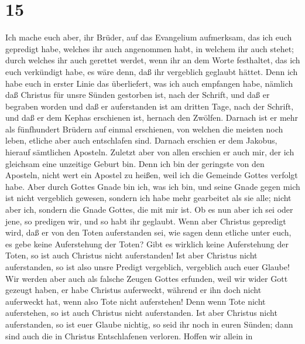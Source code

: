 \hypertarget{section-14}{%
\section{15}\label{section-14}}

 Ich mache euch aber, ihr Brüder, auf das Evangelium
aufmerksam, das ich euch gepredigt habe, welches ihr auch angenommen
habt, in welchem ihr auch stehet;  durch welches ihr auch
gerettet werdet, wenn ihr an dem Worte festhaltet, das ich euch
verkündigt habe, es wäre denn, daß ihr vergeblich geglaubt hättet.
 Denn ich habe euch in erster Linie das überliefert, was
ich auch empfangen habe, nämlich daß Christus für unsre Sünden gestorben
ist, nach der Schrift,  und daß er begraben worden und daß
er auferstanden ist am dritten Tage, nach der Schrift, 
und daß er dem Kephas erschienen ist, hernach den Zwölfen.
 Darnach ist er mehr als fünfhundert Brüdern auf einmal
erschienen, von welchen die meisten noch leben, etliche aber auch
entschlafen sind.  Darnach erschien er dem Jakobus,
hierauf sämtlichen Aposteln.  Zuletzt aber von allen
erschien er auch mir, der ich gleichsam eine unzeitige Geburt bin.
 Denn ich bin der geringste von den Aposteln, nicht wert
ein Apostel zu heißen, weil ich die Gemeinde Gottes verfolgt habe.
 Aber durch Gottes Gnade bin ich, was ich bin, und seine
Gnade gegen mich ist nicht vergeblich gewesen, sondern ich habe mehr
gearbeitet als sie alle; nicht aber ich, sondern die Gnade Gottes, die
mit mir ist.  Ob es nun aber ich sei oder jene, so
predigen wir, und so habt ihr geglaubt.  Wenn aber
Christus gepredigt wird, daß er von den Toten auferstanden sei, wie
sagen denn etliche unter euch, es gebe keine Auferstehung der Toten?
 Gibt es wirklich keine Auferstehung der Toten, so ist
auch Christus nicht auferstanden!  Ist aber Christus
nicht auferstanden, so ist also unsre Predigt vergeblich, vergeblich
auch euer Glaube!  Wir werden aber auch als falsche
Zeugen Gottes erfunden, weil wir wider Gott gezeugt haben, er habe
Christus auferweckt, während er ihn doch nicht auferweckt hat, wenn also
Tote nicht auferstehen!  Denn wenn Tote nicht
auferstehen, so ist auch Christus nicht auferstanden. 
Ist aber Christus nicht auferstanden, so ist euer Glaube nichtig, so
seid ihr noch in euren Sünden;  dann sind auch die in
Christus Entschlafenen verloren.  Hoffen wir allein in
